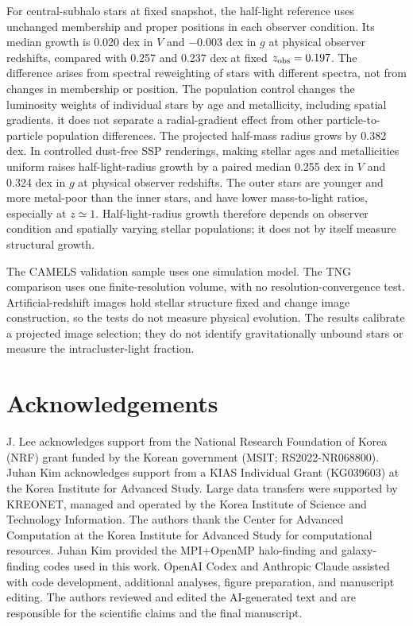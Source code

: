 \documentclass[usenatbib]{mnras}
\begin{document}
For central-subhalo stars at fixed snapshot, the half-light reference
uses unchanged membership and proper positions in each observer
condition. Its median growth is 0.020 dex in $V$ and $-0.003$ dex in
$g$ at physical observer redshifts, compared with 0.257 and 0.237 dex
at fixed $z_{\rm obs}=0.197$. The difference arises from spectral
reweighting of stars with different spectra, not from changes in
membership or position. The population control changes the luminosity weights
of individual stars by age and metallicity, including spatial gradients.
it does not separate a radial-gradient effect from other particle-to-particle
population differences. The projected half-mass radius grows by
0.382 dex. In controlled dust-free SSP renderings, making stellar ages
and metallicities uniform raises half-light-radius growth by a paired
median 0.255 dex in $V$ and 0.324 dex in $g$ at physical observer
redshifts. The outer stars are younger and more metal-poor than the inner
stars, and have lower mass-to-light ratios, especially at $z\simeq1$.
Half-light-radius growth therefore depends on observer condition and
spatially varying stellar populations; it does not by itself measure
structural growth.

The CAMELS validation sample uses one simulation model. The TNG comparison uses
one finite-resolution volume, with no resolution-convergence test.
Artificial-redshift images hold stellar structure fixed and change
image construction, so the tests do not measure physical evolution.
The results calibrate a projected image selection; they do not identify
gravitationally unbound stars or measure the intracluster-light fraction.
\FloatBarrier
\section*{Acknowledgements}

J. Lee acknowledges support from the National Research Foundation of Korea
(NRF) grant funded by the Korean government (MSIT; RS2022-NR068800).
Juhan Kim acknowledges support from a KIAS Individual Grant (KG039603) at
the Korea Institute for Advanced Study. Large data transfers were supported
by KREONET, managed and operated by the Korea Institute of Science and
Technology Information. The authors thank the Center for Advanced Computation
at the Korea Institute for Advanced Study for computational resources.
Juhan Kim provided the MPI+OpenMP halo-finding and galaxy-finding codes used
in this work. OpenAI Codex and Anthropic Claude assisted with code development,
additional analyses, figure preparation, and manuscript editing. The authors reviewed and edited the AI-generated text and are responsible
for the scientific claims and the final manuscript.
\end{document}

